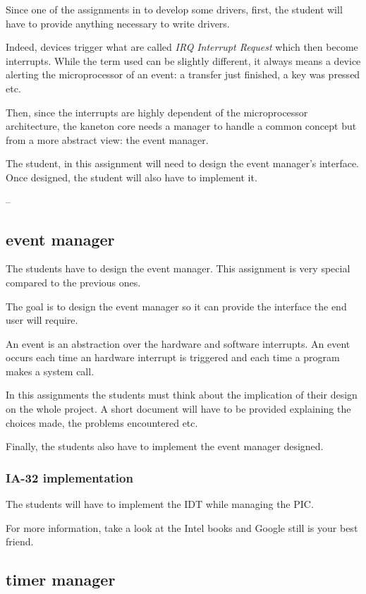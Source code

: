Since one of the assignments in to develop some drivers, first,
the student will have to provide anything necessary to write drivers.

Indeed, devices trigger what are called \textit{IRQ}
\textit{Interrupt Request} which then become interrupts. While the term
used can be slightly different, it always means a device alerting the
microprocessor of an event: a transfer just finished, a key was pressed
etc.

Then, since the interrupts are highly dependent of the microprocessor
architecture, the kaneton core needs a manager to handle a common
concept but from a more abstract view: the event manager.

The student, in this assignment will need to design the event manager's
interface. Once designed, the student will also have to implement it.


--

\subsection{event manager}

The students have to design the event manager. This assignment is very
special compared to the previous ones.

The goal is to design the event manager so it can provide the
interface the end user will require.

An event is an abstraction over the hardware and software interrupts.
An event occurs each time an hardware interrupt is triggered and each
time a program makes a system call.

In this assignments the students must think about the implication of
their design on the whole project. A short document will have to be
provided explaining the choices made, the problems encountered etc.

Finally, the students also have to implement the event manager designed.

\subsubsection{IA-32 implementation}

The students will have to implement the IDT while managing the PIC.

For more information, take a look at the Intel books and Google still
is your best friend.

\subsection{timer manager}

